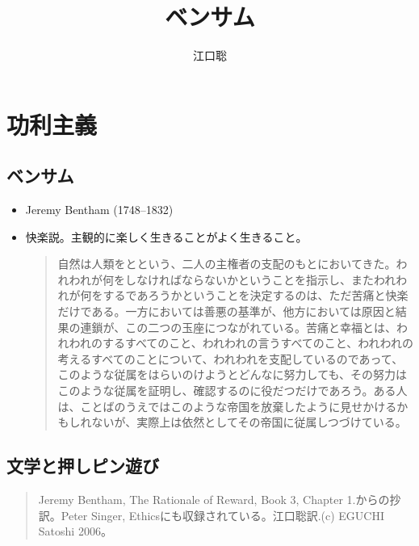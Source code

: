\documentclass[uplatex,dvipdfmx]{jsarticle}
\author{江口聡}
\title{ベンサム}
\begin{document}
\maketitle
\else\chapter{功利主義}\fi


\section{ベンサム}

\begin{itemize}
\item Jeremy Bentham (1748--1832)
\item 快楽説。主観的に楽しく生きることがよく生きること。

  \begin{quote}\small{}
    自然は人類をとという、二人の主権者の支配のもとにおいてきた。われわれが何をしなければならないかということを指示し、またわれわれが何をするであろうかということを決定するのは、ただ苦痛と快楽だけである。一方においては善悪の基準が、他方においては原因と結果の連鎖が、この二つの玉座につながれている。苦痛と幸福とは、われわれのするすべてのこと、われわれの言うすべてのこと、われわれの考えるすべてのことについて、われわれを支配しているのであって、このような従属をはらいのけようとどんなに努力しても、その努力はこのような従属を証明し、確認するのに役だつだけであろう。ある人は、ことばのうえではこのような帝国を放棄したように見せかけるかもしれないが、実際上は依然としてその帝国に従属しつづけている。\citep[邦訳pp. 81-2]{bentham1789:_introd_to_princ_of_moral_and_legis}
  \end{quote}

\end{itemize}


  \section*{文学と押しピン遊び}



\begin{quote}
\small Jeremy Bentham, The Rationale of Reward, Book 3, Chapter 1.からの抄訳。Peter Singer,
  Ethicsにも収録されている。江口聡訳.(c) EGUCHI Satoshi 2006。
\end{quote}
\end{document}
